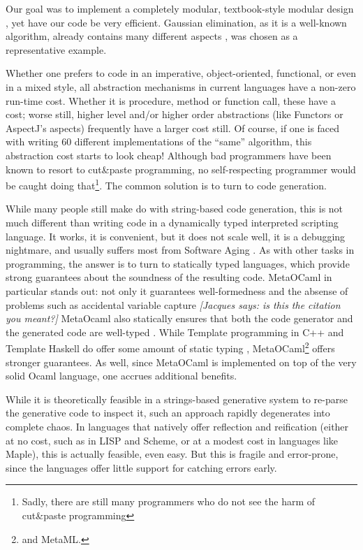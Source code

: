\documentclass{llncs}
\newcommand{\jacques}[1]{{\it [Jacques says: #1]}}
\begin{document}
Our goal was to implement a completely modular, textbook-style 
modular design \cite{journals/cacm/parnas72a}, yet 
have our code be very efficient.  Gaussian elimination, as it is a  
well-known algorithm, already contains many different aspects 
\cite{carette04}, was chosen as a representative example.

Whether one prefers to code in an imperative, object-oriented, functional, 
or even in a mixed style, all abstraction mechanisms in current
languages have a non-zero run-time cost.  Whether it is procedure,
method or function call, these have a cost; worse still, higher level
and/or higher order abstractions (like Functors or AspectJ's aspects)
frequently have a larger cost still.  Of course, if one is faced with
writing 60 different implementations of the ``same'' algorithm, this
abstraction cost starts to look cheap!  Although bad programmers have
been known to resort to cut\&paste programming, no self-respecting
programmer would be caught doing that\footnote{Sadly, there are still
many programmers who do not see the harm of cut\&paste programming}.
The common solution is to turn to code generation.

While many people still make do with string-based code generation,
this is not much different than writing code in a dynamically typed
interpreted scripting language.  It works, it is convenient, but it
does not scale well, it is a debugging nightmare, and usually suffers
most from Software Aging \cite{parnas_aging}.  As with other tasks in
programming, the answer is to turn to statically typed languages,
which provide strong guarantees about the soundness of the resulting
code.  MetaOCaml \cite{CTHL03,metaocaml-org} in particular stands
out: not only it guarantees well-formedness and the absense of problems 
such as accidental variable capture \cite{HygienicMacros}
\jacques{is this the citation you meant?}
MetaOcaml also
statically ensures that both the code generator and the generated code
are well-typed \cite{TahaSheard97,TahaThesis}.  While Template
programming in C++ and Template Haskell do offer some amount of static
typing \cite{conf/dagstuhl/CzarneckiOST03}, MetaOCaml\footnote{and
  MetaML.} offers stronger guarantees.  As well, since MetaOCaml is
implemented on top of the very solid Ocaml language, one accrues
additional benefits.

While it is theoretically feasible in a strings-based
generative system to re-parse the generative code to inspect it, such
an approach rapidly degenerates into complete chaos.  In languages
that natively offer reflection and reification (either at no cost, 
such as in LISP and Scheme, or at a modest cost in languages like 
Maple), this is actually feasible, even easy.  But this is fragile
and error-prone, since the languages offer little support for catching
errors early.
\end{document}
